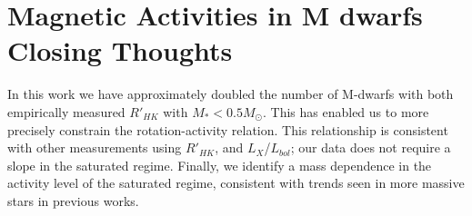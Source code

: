 \section{Magnetic Activities in M dwarfs Closing Thoughts}\label{sec:magActivity-conclusions}
In this work we have approximately doubled the number of M-dwarfs with both
empirically measured $R'_{HK}$ with $M_{*} < 0.5 M_{\odot}$. This has enabled
us to more precisely constrain the rotation-activity relation. This
relationship is consistent with other measurements using $R'_{HK}$, and
$L_{X}$/$L_{bol}$; our data does not require a slope in the saturated regime.
Finally, we identify a mass dependence in the activity level of the saturated
regime, consistent with trends seen in more massive stars in previous works.

